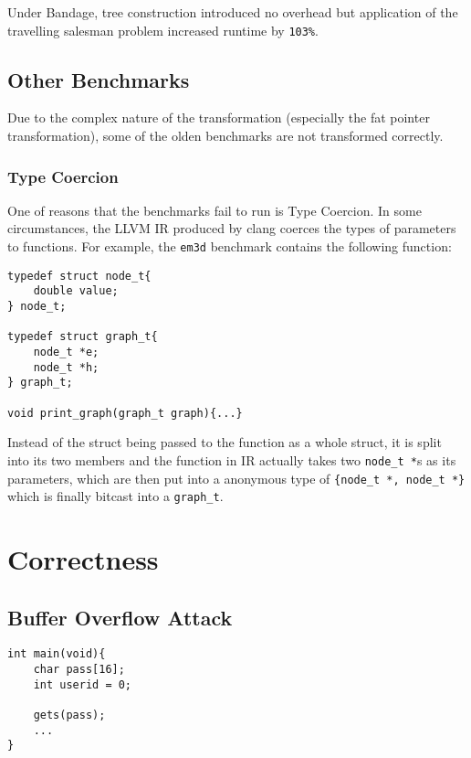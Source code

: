 Under Bandage, tree construction introduced no overhead but application of the travelling salesman problem increased runtime by \verb!103%!.

\subsection{Other Benchmarks}

Due to the complex nature of the transformation (especially the fat pointer transformation), some of the olden benchmarks are not transformed correctly.

\subsubsection{Type Coercion}

One of reasons that the benchmarks fail to run is Type Coercion.
In some circumstances, the LLVM IR produced by clang coerces the types of parameters to functions.
For example, the \verb!em3d! benchmark contains the following function:

\begin{verbatim}
typedef struct node_t{
    double value;
} node_t;

typedef struct graph_t{
    node_t *e;
    node_t *h;
} graph_t;

void print_graph(graph_t graph){...}
\end{verbatim}

Instead of the struct being passed to the function as a whole struct, it is split into its two members and the function in IR actually takes two \verb!node_t *!s as its parameters, which are then put into a anonymous type of \verb!{node_t *, node_t *}! which is finally bitcast into a \verb!graph_t!.

\section{Correctness}

\subsection{Buffer Overflow Attack}

\begin{verbatim}
int main(void){
    char pass[16];
    int userid = 0;

    gets(pass);
    ...
}
\end{verbatim}

